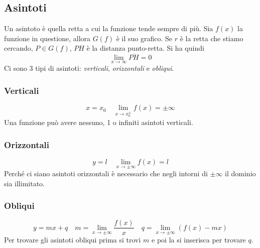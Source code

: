 \subsection{Asintoti}
Un asintoto è quella retta a cui la funzione tende sempre di più. Sia $f(x)$ la funzione in 
questione, allora $G(f)$ è il suo grafico. Se $r$ è la retta che stiamo cercando, $P\in G(f)$,
$PH$ è la distanza punto-retta. Si ha quindi
\begin{equation*}
  \lim_{x\to\infty}\overline{PH}=0 
\end{equation*}
Ci sono 3 tipi di asintoti: \emph{verticali},  \emph{orizzontali} e  \emph{obliqui}.

\subsubsection{Verticali}
\begin{equation*}
  x=x_0\quad \lim_{x\to x_0^{\pm}}f(x)=\pm\infty
\end{equation*}
Una funzione può avere nessuno, 1 o infiniti asintoti verticali.

\subsubsection{Orizzontali}
\begin{equation*}
  y=l\quad \lim_{x\to\pm\infty}f(x)=l
\end{equation*}
Perché ci siano asintoti orizzontali è necessario che negli intorni di $\pm\infty$ il dominio sia
illimitato.

\subsubsection{Obliqui}
\begin{equation*}
  y=mx+q\quad m =\lim_{x\to\pm\infty}\frac{f(x)}{x}\quad 
  q=\lim_{x\to\pm\infty}\left( f(x)-mx \right) 
\end{equation*}
Per trovare gli asintoti obliqui prima si trovi $m$ e poi la si inserisca per trovare $q$.

